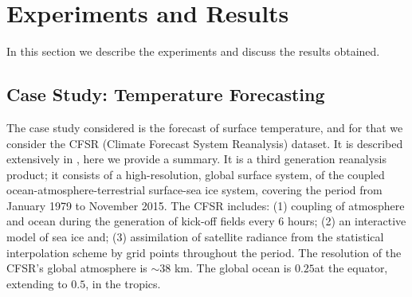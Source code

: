 
\section{Experiments and Results}

In this section we describe the experiments and discuss the results obtained.

\subsection{Case Study: Temperature Forecasting}

The case study considered is the forecast of surface temperature, and for that we consider the CFSR (Climate Forecast System Reanalysis) dataset. It is described extensively in \cite{Saha2010}, here we provide a summary. It is a third generation reanalysis product; it consists of a high-resolution, global surface system, of the coupled ocean-atmosphere-terrestrial surface-sea ice system, covering the period from January 1979 to November 2015. The CFSR includes: (1) coupling of atmosphere and ocean during the generation of kick-off fields every 6 hours; (2) an interactive model of sea ice and; (3) assimilation of satellite radiance from the statistical interpolation scheme by grid points throughout the period. The resolution of the CFSR's global atmosphere is $\sim 38$ km. The global ocean is $0.25$\textdegree at the equator, extending to $0.5$\textdegree, in the tropics. %



